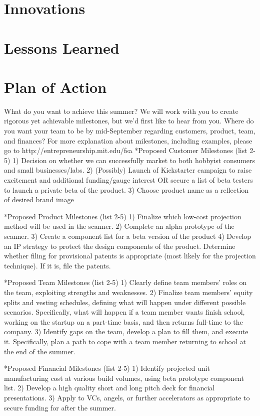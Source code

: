 \documentclass{article}
\begin{document}
\section{Innovations}

\section{Lessons Learned}

\section{Plan of Action}
What do you want to achieve this summer? We will work with you to create
rigorous yet achievable milestones, but we'd first like to hear from you. Where
do you want your team to be by mid-September regarding customers, product, team,
and finances? For more explanation about milestones, including examples, please
go to http://entrepreneurship.mit.edu/fsa *Proposed Customer Milestones (list
2-5) 1) Decision on whether we can successfully market to both hobbyist
consumers and small businesses/labs. 2) (Possibly) Launch of Kickstarter
campaign to raise excitement and additional funding/gauge interest OR secure a
list of beta testers to launch a private beta of the product. 3) Choose product
name as a reflection of desired brand image

*Proposed Product Milestones (list 2-5) 1) Finalize which low-cost projection
method will be used in the scanner. 2) Complete an alpha prototype of the
scanner. 3) Create a component list for a beta version of the product 4) Develop
an IP strategy to protect the design components of the product. Determine
whether filing for provisional patents is appropriate (most likely for the
projection technique). If it is, file the patents.

*Proposed Team Milestones (list 2-5) 1) Clearly define team members' roles on
the team, exploiting strengths and weaknesses. 2) Finalize team members' equity
splits and vesting schedules, defining what will happen under different possible
scenarios. Specifically, what will happen if a team member wants finish school,
working on the startup on a part-time basis, and then returns full-time to the
company. 3) Identify gaps on the team, develop a plan to fill them, and execute
it. Specifically, plan a path to cope with a team member returning to school at
the end of the summer.

*Proposed Financial Milestones (list 2-5) 1) Identify projected unit
manufacturing cost at various build volumes, using beta prototype component
list. 2) Develop a high quality short and long pitch deck for financial
presentations. 3) Apply to VCs, angels, or further accelerators as appropriate
to secure funding for after the summer.
\end{document}

